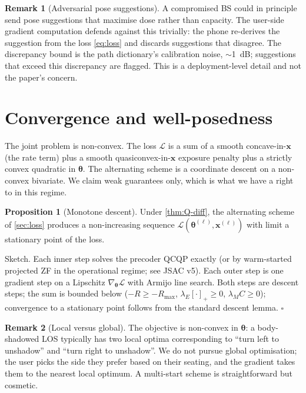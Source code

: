 \documentclass[11pt,a4paper]{article}
\theoremstyle{definition}
\newtheorem{proposition}[proposition]{Proposition}
\newtheorem{remark}[remark]{Remark}
\newcommand{\xvec}{\mathbf{x}}
\newcommand{\thetab}{\bm{\theta}}
\begin{document}
\begin{remark}[Adversarial pose suggestions]
A compromised BS could in principle send pose suggestions that
maximise dose rather than capacity.  The user-side gradient
computation defends against this trivially: the phone re-derives
the suggestion from the loss \eqref{eq:loss} and discards
suggestions that disagree.  The discrepancy bound is the path
dictionary's calibration noise, $\sim$\SI{1}{dB}; suggestions that
exceed this discrepancy are flagged.  This is a deployment-level
detail and not the paper's concern.
\end{remark}

\section{Convergence and well-posedness}\label{sec:convergence}

The joint problem is non-convex.  The loss $\mathcal{L}$ is a sum of
a smooth concave-in-$\xvec$ (the rate term) plus a smooth
quasiconvex-in-$\xvec$ exposure penalty plus a strictly convex
quadratic in $\thetab$.  The alternating scheme is a coordinate
descent on a non-convex bivariate.  We claim weak guarantees only,
which is what we have a right to in this regime.

\begin{proposition}[Monotone descent]\label{prop:descent}
Under \cref{thm:Q-diff}, the alternating scheme of \cref{sec:loss}
produces a non-increasing sequence
$\mathcal{L}(\thetab^{(\ell)},\xvec^{(\ell)})$ with limit a
stationary point of the loss.
\end{proposition}

\noindent Sketch.  Each inner step solves the precoder QCQP
exactly (or by warm-started projected ZF in the operational regime;
see JSAC v5).  Each outer step is one gradient step on a Lipschitz
$\nabla_\thetab\mathcal{L}$ with Armijo line search.  Both steps
are descent steps; the sum is bounded below ($-R\ge -R_{\max}$,
$\lambda_E[\cdot]_+\ge 0$, $\lambda_MC\ge 0$); convergence to a
stationary point follows from the standard descent lemma.  $\square$

\begin{remark}[Local versus global]
The objective is non-convex in $\thetab$: a body-shadowed LOS
typically has two local optima corresponding to ``turn left to
unshadow'' and ``turn right to unshadow''.  We do not pursue global
optimisation; the user picks the side they prefer based on their
seating, and the gradient takes them to the nearest local optimum.
A multi-start scheme is straightforward but cosmetic.
\end{remark}
\end{document}
